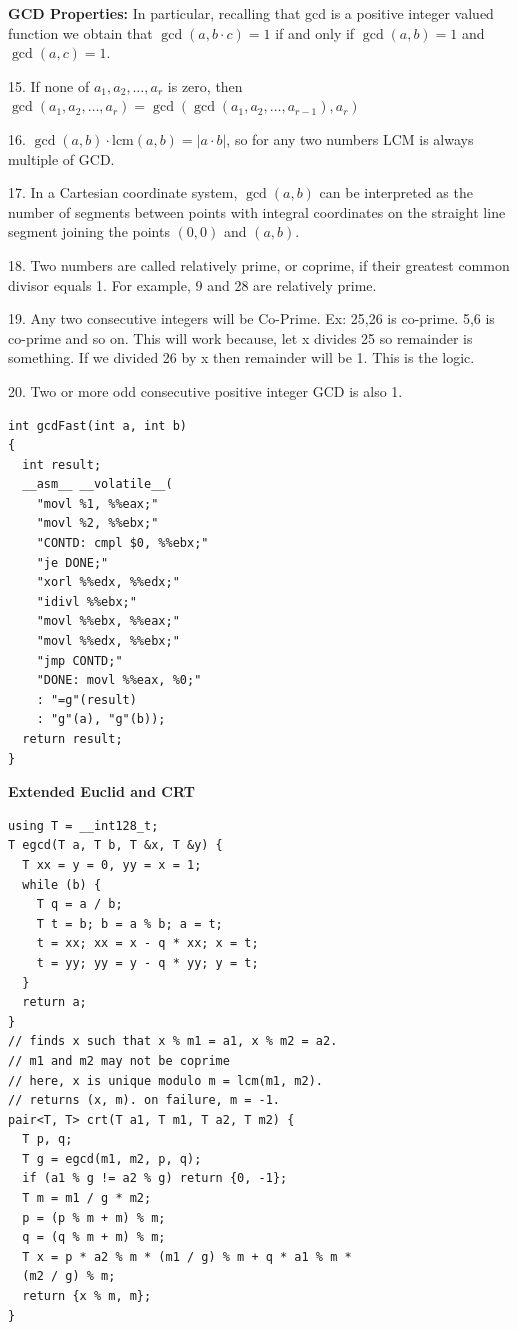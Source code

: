 
\textbf{GCD Properties:}
In particular, recalling that gcd is a positive integer valued function we obtain that $\gcd(a, b \cdot c) = 1$ if and only if $\gcd(a, b) = 1$ and $\gcd(a, c) = 1$.

15. If none of $a_1, a_2, \ldots, a_r$ is zero, then $\gcd(a_1, a_2, \ldots, a_r) = \gcd(\gcd(a_1, a_2, \ldots, a_{r-1}), a_r)$

16. $\gcd(a,b) \cdot \text{lcm}(a,b) = |a \cdot b|$, so for any two numbers LCM is always multiple of GCD.

17. In a Cartesian coordinate system, $\gcd(a, b)$ can be interpreted as the number of segments between points with integral coordinates on the straight line segment joining the points $(0, 0)$ and $(a, b)$.

18. Two numbers are called relatively prime, or coprime, if their greatest common divisor equals 1. For example, 9 and 28 are relatively prime.

19. Any two consecutive integers will be Co-Prime. Ex: 25,26 is co-prime. 5,6 is co-prime and so on. This will work because, let x divides 25 so remainder is something. If we divided 26 by x then remainder will be 1. This is the logic.

20. Two or more odd consecutive positive integer GCD is also 1.

\begin{lstlisting}
int gcdFast(int a, int b)
{
  int result;
  __asm__ __volatile__(
    "movl %1, %%eax;"
    "movl %2, %%ebx;"
    "CONTD: cmpl $0, %%ebx;"
    "je DONE;"
    "xorl %%edx, %%edx;"
    "idivl %%ebx;"
    "movl %%ebx, %%eax;"
    "movl %%edx, %%ebx;"
    "jmp CONTD;"
    "DONE: movl %%eax, %0;"
    : "=g"(result)
    : "g"(a), "g"(b));
  return result;
}
\end{lstlisting}

\textbf{Extended Euclid and CRT}
\begin{lstlisting}
using T = __int128_t;
T egcd(T a, T b, T &x, T &y) {
  T xx = y = 0, yy = x = 1;
  while (b) {
    T q = a / b;
    T t = b; b = a % b; a = t;
    t = xx; xx = x - q * xx; x = t;
    t = yy; yy = y - q * yy; y = t;
  }
  return a;
}
// finds x such that x % m1 = a1, x % m2 = a2.
// m1 and m2 may not be coprime
// here, x is unique modulo m = lcm(m1, m2).
// returns (x, m). on failure, m = -1.
pair<T, T> crt(T a1, T m1, T a2, T m2) {
  T p, q;
  T g = egcd(m1, m2, p, q);
  if (a1 % g != a2 % g) return {0, -1};
  T m = m1 / g * m2;
  p = (p % m + m) % m;
  q = (q % m + m) % m;
  T x = p * a2 % m * (m1 / g) % m + q * a1 % m *
  (m2 / g) % m;
  return {x % m, m};
}
\end{lstlisting}

